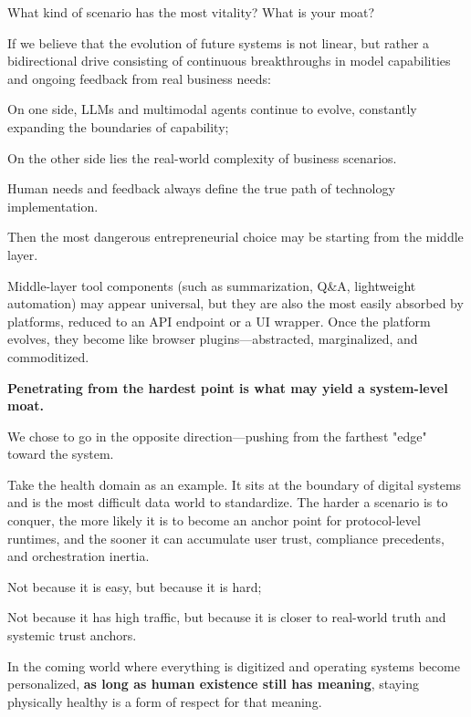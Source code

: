 \newpage
\begin{thinkbox}
What kind of scenario has the most vitality? What is your moat?
\end{thinkbox}


If we believe that the evolution of future systems is not linear, but rather a bidirectional drive consisting of continuous breakthroughs in model capabilities and ongoing feedback from real business needs:

{\kaiti
On one side, LLMs and multimodal agents continue to evolve, constantly expanding the boundaries of capability;

On the other side lies the real-world complexity of business scenarios.

Human needs and feedback always define the true path of technology implementation.
}

Then the most dangerous entrepreneurial choice may be starting from the middle layer.

Middle-layer tool components (such as summarization, Q\&A, lightweight automation) may appear universal, but they are also the most easily absorbed by platforms, reduced to an API endpoint or a UI wrapper.
Once the platform evolves, they become like browser plugins---abstracted, marginalized, and commoditized.

\textbf{Penetrating from the hardest point is what may yield a system-level moat.}

\vspace{1em}

We chose to go in the opposite direction---pushing from the farthest "edge" toward the system.

Take the health domain as an example. It sits at the boundary of digital systems and is the most difficult data world to standardize.
The harder a scenario is to conquer, the more likely it is to become an anchor point for protocol-level runtimes, and the sooner it can accumulate user trust, compliance precedents, and orchestration inertia.

{\kaiti
Not because it is easy, but because it is hard;

Not because it has high traffic, but because it is closer to real-world truth and systemic trust anchors.
}

\vspace{1em}

In the coming world where everything is digitized and operating systems become personalized, \textbf{as long as human existence still has meaning}, staying physically healthy is a form of respect for that meaning.

